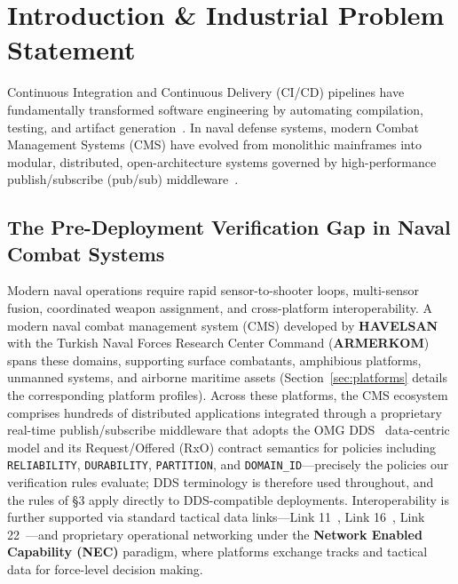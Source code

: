 \documentclass[sigconf,9pt]{acmart}
\begin{document}

\maketitle

\section{Introduction \& Industrial Problem Statement}

Continuous Integration and Continuous Delivery (CI/CD) pipelines have fundamentally transformed software engineering by automating compilation, testing, and artifact generation~\cite{humble2010}. In naval defense systems, modern Combat Management Systems (CMS) have evolved from monolithic mainframes into modular, distributed, open-architecture systems governed by high-performance publish/subscribe (pub/sub) middleware~\cite{omg2015dds}.

\subsection{The Pre-Deployment Verification Gap in Naval Combat Systems} 

Modern naval operations require rapid sensor-to-shooter loops, multi-sensor fusion, coordinated weapon assignment, and cross-platform interoperability. A modern naval combat management system (CMS) developed by \textbf{HAVELSAN} with the Turkish Naval Forces Research Center Command (\textbf{ARMERKOM}) spans these domains, supporting surface combatants, amphibious platforms, unmanned systems, and airborne maritime assets (Section~\ref{sec:platforms} details the corresponding platform profiles). Across these platforms, the CMS ecosystem comprises hundreds of distributed applications integrated through a proprietary real-time publish/subscribe middleware that adopts the OMG DDS~\cite{omg2015dds} data-centric model and its Request/Offered (RxO) contract semantics for policies including \texttt{RELIABILITY}, \texttt{DURABILITY}, \texttt{PARTITION}, and \texttt{DOMAIN\_ID}---precisely the policies our verification rules evaluate; DDS terminology is therefore used throughout, and the rules of \S3 apply directly to DDS-compatible deployments. Interoperability is further supported via standard tactical data links---Link 11~\cite{stanag5511}, Link 16~\cite{stanag5516}, Link 22~\cite{stanag5522}---and proprietary operational networking under the \textbf{Network Enabled Capability (NEC)} paradigm, where platforms exchange tracks and tactical data for force-level decision making.
\end{document}
